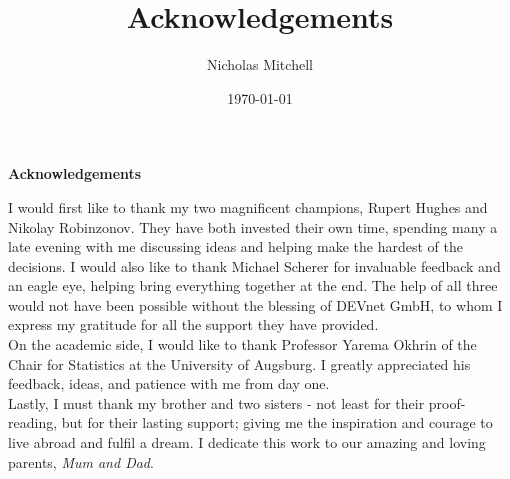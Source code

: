 \documentclass{article}
\author{Nicholas Mitchell}
\date{\today}
\title{Acknowledgements}
\begin{document}
\maketitle
\tableofcontents

\pagebreak


\vspace{5cm}

\Large  

\noindent
\textbf{Acknowledgements}

\normalsize
\vspace{13mm}

\noindent
I would first like to thank my two magnificent champions, Rupert Hughes and Nikolay Robinzonov. They have both invested their own time, spending many a late evening with me discussing ideas and helping make the hardest of the decisions. I would also like to thank Michael Scherer for invaluable feedback and an eagle eye, helping bring everything together at the end. The help of all three would not have been possible without the blessing of DEVnet GmbH, to whom I express my gratitude for all the support they have provided.\\

\vspace{5mm}
\noindent
On the academic side, I would like to thank Professor Yarema Okhrin of the Chair for Statistics at the University of Augsburg. I greatly appreciated his feedback, ideas, and patience with me from day one.\\


\vspace{5mm}
\noindent
Lastly, I must thank my brother and two sisters - not least for their proof-reading, but for their lasting support; giving me the inspiration and courage to live abroad and fulfil a dream. I dedicate this work to our amazing and loving parents, \emph{Mum and Dad}.


\pagebreak
\end{document}
